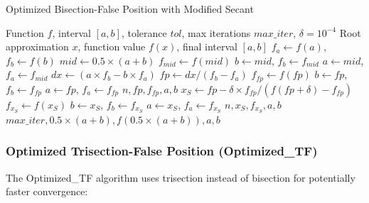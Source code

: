 \documentclass[11pt,a4paper]{article}
\begin{document}
\begin{algorithm}[H]
\caption{Optimized Bisection-False Position with Modified Secant}
\begin{algorithmic}[1]
\REQUIRE Function $f$, interval $[a,b]$, tolerance $tol$, max iterations $max\_iter$, $\delta = 10^{-4}$
\ENSURE Root approximation $x$, function value $f(x)$, final interval $[a,b]$
\STATE $f_a \leftarrow f(a)$, $f_b \leftarrow f(b)$
    \STATE $mid \leftarrow 0.5 \times (a + b)$
    \STATE $f_{mid} \leftarrow f(mid)$
        \STATE $b \leftarrow mid$, $f_b \leftarrow f_{mid}$
    \ELSE
        \STATE $a \leftarrow mid$, $f_a \leftarrow f_{mid}$
    \ENDIF
    \STATE $dx \leftarrow (a \times f_b - b \times f_a)$
    \STATE $fp \leftarrow dx / (f_b - f_a)$
    \STATE $f_{fp} \leftarrow f(fp)$
        \STATE $b \leftarrow fp$, $f_b \leftarrow f_{fp}$
    \ELSE
        \STATE $a \leftarrow fp$, $f_a \leftarrow f_{fp}$
    \ENDIF
        \RETURN $n, fp, f_{fp}, a, b$
    \ENDIF
    \STATE $x_S \leftarrow fp - \delta \times f_{fp} / (f(fp + \delta) - f_{fp})$
        \STATE $f_{x_S} \leftarrow f(x_S)$
                \STATE $b \leftarrow x_S$, $f_b \leftarrow f_{x_S}$
            \ELSE
                \STATE $a \leftarrow x_S$, $f_a \leftarrow f_{x_S}$
            \ENDIF
                \RETURN $n, x_S, f_{x_S}, a, b$
            \ENDIF
        \ENDIF
    \ENDIF
\ENDFOR
\RETURN $max\_iter, 0.5 \times (a + b), f(0.5 \times (a + b)), a, b$
\end{algorithmic}
\end{algorithm}

\subsubsection{Optimized Trisection-False Position (Optimized\_TF)}

The Optimized\_TF algorithm uses trisection instead of bisection for potentially faster convergence:
\end{document}
